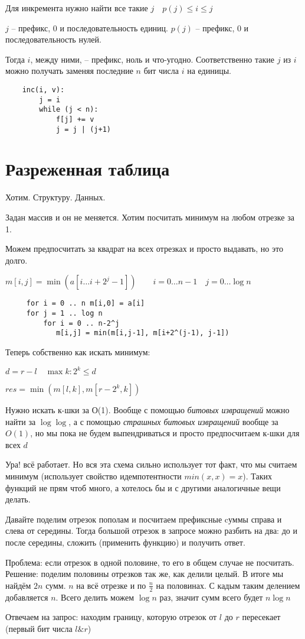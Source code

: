 \documentclass{book}
\theoremstyle{definition}
\begin{document}
Для инкремента нужно найти все такие $j\quad p(j)\leqslant i\leqslant j$

$j$ -- префикс, 0 и последовательность единиц.  $p(j)$ -- префикс, 0 и последовательность нулей.

Тогда  $i$, между ними, -- префикс, ноль и что-угодно. Соответственно такие $j$ из  $i$ можно получать заменяя последние  $n$ бит числа $i$ на единицы.

 \begin{verbatim}
    inc(i, v):
        j = i
        while (j < n):
            f[j] += v
            j = j | (j+1)

\end{verbatim}


\section{Разреженная таблица}

Хотим. Структуру. Данных.

Задан массив и он не меняется. Хотим посчитать минимум на любом отрезке за 1.

Можем предпосчитать за квадрат на всех отрезках и просто выдавать, но это долго.

$m[i,j] = \min\left( a\left[ i \ldots i+2^j-1 \right]  \right) \qquad i = 0 \ldots n-1\quad j = 0 \ldots \log n$

\begin{verbatim}
     for i = 0 .. n m[i,0] = a[i]
     for j = 1 .. log n
         for i = 0 .. n-2^j
            m[i,j] = min(m[i,j-1], m[i+2^(j-1), j-1])
\end{verbatim}

Теперь собственно как искать минимум:

$d = r-l\quad \max k: 2^k \leqslant  d$

$res = \min\left( m[l,k], m[r-2^k, k] \right) $ 

Нужно искать к-шки за О(1). Вообще с помощью \textit{битовых извращений} можно найти за $\log\log$, а с помощью \textit{страшных битовых извращений} вообще за  $O(1)$, но мы пока не будем выпендриваться  и просто предпосчитаем к-шки для всех  $d$

Ура! всё работает. Но вся эта схема сильно использует тот факт, что мы считаем минимум (использует свойство идемпотентности $min(x,x) = x$). Таких функций не прям чтоб много, а хотелось бы и с другими аналогичные вещи делать.

Давайте поделим отрезок пополам и посчитаем  префиксные cуммы справа и слева от середины. Тогда большой отрезок в запросе можно разбить на два:  до и после середины, сложить (применить функцию) и получить ответ.

Проблема: если отрезок в одной половине, то его в общем случае не посчитать. Решение: поделим половины отрезков так же, как делили целый. В итоге мы найдём $2n$ сумм.  $n$ на всё отрезке и по  $\frac{n}{2}$ на половинах. С кадым таким делением добавляется $n$. Всего делить можем  $\log n$ раз, значит сумм всего будет $n\log n$

Отвечаем на запрос: находим границу, которую отрезок от  $l$ до $r$ пересекает (первый бит числа  $l\& r$)
\end{document}
